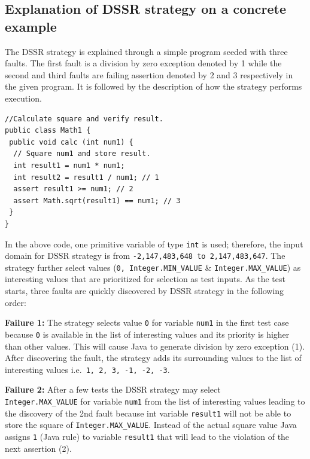 \documentclass[conference]{IEEEtran}
\begin{document}


\subsection{Explanation of DSSR strategy on a concrete example}
\noindent The DSSR strategy is explained through a simple program seeded with three faults. The first fault is a division by zero exception denoted by 1 while the second and third faults are failing assertion denoted by 2 and 3 respectively in the given program. It is followed by the description of how the strategy performs execution.

\begin{lstlisting}
//Calculate square and verify result. 
public class Math1 {
 public void calc (int num1) {
  // Square num1 and store result. 
  int result1 = num1 * num1;
  int result2 = result1 / num1; // 1
  assert result1 >= num1; // 2
  assert Math.sqrt(result1) == num1; // 3
 } 
}
\end{lstlisting}
\noindent In the above code, one primitive variable of type \verb+int+ is used; therefore, the input domain for DSSR strategy is from \verb+-2,147,483,648 to 2,147,483,647+. The strategy further select values (\verb+0, Integer.MIN_VALUE+ \& \verb+Integer.MAX_VALUE+) as interesting values that are prioritized for selection as test inputs. 
As the test starts, three faults are quickly discovered by DSSR strategy in the following order:

\noindent \textbf{Failure 1:} The strategy selects value \verb+0+ for variable \verb+num1+  in the first test case because \verb+0+ is available in the list of interesting values and its priority is higher than other values. This will cause Java to generate division by zero exception (1). After discovering the fault, the strategy adds its surrounding values to the list of interesting values i.e.\verb+ 1, 2, 3, -1, -2, -3+. 

\noindent \textbf{Failure 2:} After a few tests the DSSR strategy may select \\ \verb+Integer.MAX_VALUE+ for variable \verb+num1+  from the list of interesting values leading to the discovery of the 2nd fault because int variable \verb+result1+ will not be able to store the square of \verb+Integer.MAX_VALUE+. Instead of the actual square value Java assigns \verb+1+ (Java rule) to variable \verb+result1+ that will lead to the violation of the next assertion (2).
\end{document}
